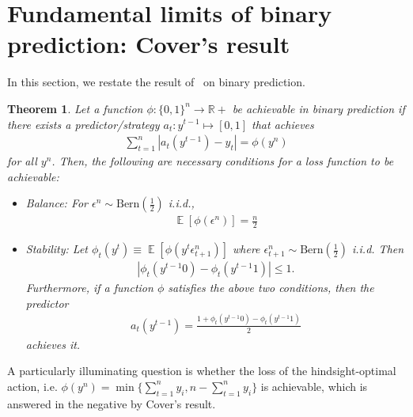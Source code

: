 \documentclass[twoside]{article}
\newtheorem{mytheorem}{Theorem}
\newcommand{\e}{\epsilon}
\DeclareMathOperator\E{\mathbb{E}}
\begin{document}
\onecolumn

\section{Fundamental limits of binary prediction: Cover's result}

In this section, we restate the result of~\cite{Cover1966} on binary prediction.

\begin{mytheorem} 
Let a function $\phi : \{0,1\}^n \to \mathbb{R}+$ be \emph{achievable} in binary prediction if there exists a predictor/strategy $a_t: y^{t-1} \mapsto [0,1]$ that achieves 
\begin{align}\label{eq:AchievabilityDefn}
    \sum_{t=1}^n |a_t(y^{t-1})-y_t| = \phi(y^n)
\end{align}
for all $y^n$. Then, the following are necessary conditions for a loss function to be achievable:
\begin{itemize}
    \item Balance: For $\e^n \sim \mathrm{Bern}\left(\frac{1}{2}\right)$ i.i.d., 
    \begin{align}\label{eq:BalanceCondn}
        \E[\phi(\e^n)] = \frac{n}{2} 
    \end{align}
    \item Stability: Let $\phi_t(y^t) \equiv \E[\phi(y^{t}\e_{t+1}^n)]$ where $\e_{t+1}^n \sim \mathrm{Bern}\left(\frac{1}{2}\right)$ i.i.d. Then
    \begin{align}\label{eq:StabilityCondn}
        |\phi_t(y^{t-1}0)-\phi_t(y^{t-1}1)| \le 1. 
    \end{align}
    Furthermore, if a function $\phi$ satisfies the above two conditions, then the predictor 
    \begin{align} 
    a_t(y^{t-1}) = \frac{1+\phi_t(y^{t-1}0)-\phi_t(y^{t-1}1)}{2}
    \end{align}
    achieves it. 
\end{itemize}
\end{mytheorem}

A particularly illuminating question is whether the loss of the hindsight-optimal action, i.e. $\phi(y^n) = \min\{\sum_{t=1}^n y_i, n-\sum_{t=1}^n y_i\}$ is achievable, which is answered in the negative by Cover's result. 
\end{document}
